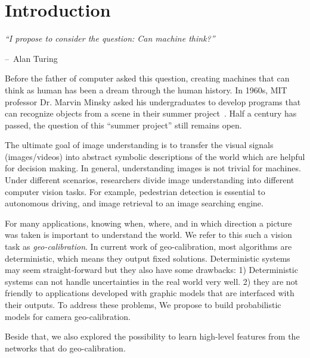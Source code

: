 \chapter{Introduction}
\label{chap:intro}

\makeatletter
\newenvironment{chapquote}[2][2em]
{\setlength{\@tempdima}{#1} \def\chapquote@author{#2} \parshape 1
  \@tempdima \dimexpr\textwidth-2\@tempdima\relax \itshape}
{\par\normalfont\hfill--\
\chapquote@author\hspace*{\@tempdima}\par\bigskip}
\makeatother

\begin{chapquote}{Alan Turing}
  ``I propose to consider the question: Can machine think?''
\end{chapquote}

Before the father of computer asked this question, creating
machines that can think as human has been a dream through the human
history. In 1960s, MIT professor Dr. Marvin Minsky asked his
undergraduates to develop programs that can recognize objects from a
scene in their summer project~\cite{boden2006mind}. Half a century has
passed, the question of this ``summer project'' still remains open.

The ultimate goal of image understanding is to transfer the visual
signals (images/videos) into abstract symbolic descriptions of the
world which are helpful for decision making.
In general, understanding images is not trivial for machines.
Under different scenarios, researchers divide image
understanding into different computer vision tasks. For example,
pedestrian detection is essential to autonomous driving, and image
retrieval to an image searching engine.

For many applications, knowing when, where, and in which direction a
picture was taken is important to understand the world. We refer to
this such a vision task as {\em geo-calibration}.
In current work of geo-calibration, most algorithms are
deterministic, which means they output fixed solutions. Deterministic
systems may seem straight-forward but they also have some 
drawbacks: 1) Deterministic systems can not handle uncertainties in
the real world very well. 2) they are not
friendly to applications developed with graphic models that are
interfaced with their outputs. To address these problems, We propose
to build probabilistic models for camera geo-calibration.

Beside that, we also explored the possibility to learn high-level
features from the networks that do geo-calibration. \todo{expand}

